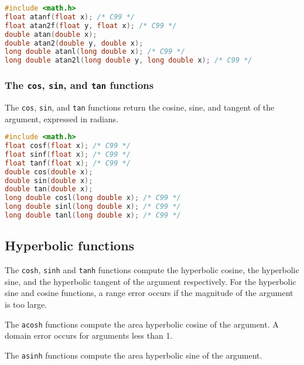 \lstset{basicstyle=\scriptsize, numbers=left, captionpos=b, tabsize=4}
\begin{lstlisting}[caption=Section \thesection listing \arabic{furthermathcnt},language={C},
breaklines=true,xleftmargin=15pt,label=lst:section\thesection listing\arabic{furthermathcnt}]
#include <math.h>
float atanf(float x); /* C99 */
float atan2f(float y, float x); /* C99 */
double atan(double x);
double atan2(double y, double x);
long double atanl(long double x); /* C99 */
long double atan2l(long double y, long double x); /* C99 */
\end{lstlisting}

\subsubsection{The \texttt{cos}, \texttt{sin}, and \texttt{tan} functions}
The \texttt{cos}, \texttt{sin}, and \texttt{tan} functions return the cosine,
sine, and tangent of the argument, expressed in radians.

\lstset{basicstyle=\scriptsize, numbers=left, captionpos=b, tabsize=4}
\begin{lstlisting}[caption=Section \thesection listing \arabic{furthermathcnt},language={C},
breaklines=true,xleftmargin=15pt,label=lst:section\thesection listing\arabic{furthermathcnt}]
#include <math.h>
float cosf(float x); /* C99 */
float sinf(float x); /* C99 */
float tanf(float x); /* C99 */
double cos(double x);
double sin(double x);
double tan(double x);
long double cosl(long double x); /* C99 */
long double sinl(long double x); /* C99 */
long double tanl(long double x); /* C99 */
\end{lstlisting}

\subsection{Hyperbolic functions}
The \texttt{cosh}, \texttt{sinh} and \texttt{tanh} functions compute the
hyperbolic cosine, the hyperbolic sine, and the hyperbolic tangent of the
argument respectively. For the hyperbolic sine and cosine functions, a range
error occurs if the magnitude of the argument is too large.

The \texttt{acosh} functions compute the area hyperbolic cosine of the
argument. A domain error occurs for arguments less than 1.

The \texttt{asinh} functions compute the area hyperbolic sine of the argument.

